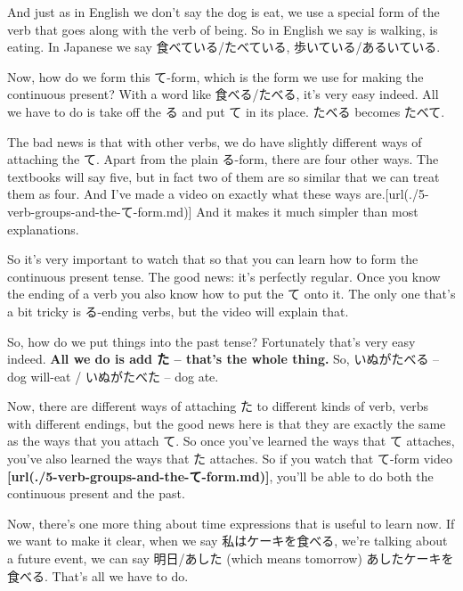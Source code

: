 And just as in English we don't say the dog is eat, we use a special form of the verb that goes along with the verb of being. So in English we say is walking, is eating. In Japanese we say 食べている/たべている, 歩いている/あるいている.

\thinrule

Now, how do we form this て-form, which is the form we use for making the continuous present? With a word like 食べる/たべる, it's very easy indeed. All we have to do is take off the る and put て in its place. たべる becomes たべて.

The bad news is that with other verbs, we do have slightly different ways of attaching the て. Apart from the plain る-form, there are four other ways. The textbooks will say five, but in fact two of them are so similar that we can treat them as four. And I've made a video on exactly what these ways are.\goto{{[}5{]}}[url(./5-verb-groups-and-the-て-form.md)] And it makes it much simpler than most explanations.

So it's very important to watch that so that you can learn how to form the continuous present tense. The good news: it's perfectly regular. Once you know the ending of a verb you also know how to put the て onto it. The only one that's a bit tricky is る-ending verbs, but the video will explain that.

\stopsectionlevel

\startsectionlevel[title={Past tense},reference={past-tense}]

So, how do we put things into the past tense? Fortunately that's very easy indeed. {\bf All we do is add た -- that's the whole thing.} So, いぬがたべる -- dog will-eat / いぬがたべた -- dog ate.

Now, there are different ways of attaching た to different kinds of verb, verbs with different endings, but the good news here is that they are exactly the same as the ways that you attach て. So once you've learned the ways that て attaches, you've also learned the ways that た attaches. So if you watch that て-form video {\bf \goto{{[}5{]}}[url(./5-verb-groups-and-the-て-form.md)]}, you'll be able to do both the continuous present and the past.

Now, there's one more thing about time expressions that is useful to learn now. If we want to make it clear, when we say 私はケーキを食べる, we're talking about a future event, we can say 明日/あした (which means tomorrow) あしたケーキを食べる. That's all we have to do.

